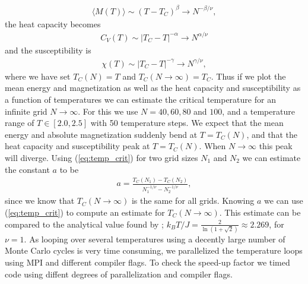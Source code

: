 \documentclass[twocolumn]{aastex62}
\begin{document}
\begin{align}\label{eq:thermoquantM}
	\langle M(T)\rangle \sim (T - T_C)^\beta \to N^{-\beta/\nu},
\end{align}
the heat capacity becomes 
\begin{align}\label{eq:thermoquantCV}
	C_V(T) \sim |T_C - T|^{-\alpha}\to N^{\alpha / \nu}
\end{align}
and the susceptibility is 
\begin{align}\label{eq:thermoquantchi}
	\chi(T)\sim |T_C - T|^{-\gamma} \to N^{\gamma/\nu},
\end{align}
where we have set $T_C(N) = T$ and $T_C(N\to\infty) = T_C$.
Thus if we plot the mean energy and magnetization as well as the heat capacity
and susceptibility as a function of temperatures we can estimate the critical
temperature for an infinite grid $N\to \infty$. For this we use $N = 40, 60, 80$
and $100$, and a temperature range of $T\in[2.0, 2.5]$ with 50 temperature steps. We expect that the mean energy
and absolute magnetization suddenly bend at $T = T_C(N)$, and that the heat
capacity and susceptibility peak at $T = T_C(N)$. When $N\to\infty$ this peak
will diverge. Using (\ref{eq:temp_crit}) for two grid sizes $N_1$ and $N_2$ we
can estimate the constant $a$ to be
\begin{align}
	a = \frac{T_C(N_1) - T_C(N_2)}{N_1^{-1/\nu} - N_2^{-1/\nu}},
\end{align}
since we know that $T_C(N\to\infty)$ is the same for all grids. Knowing $a$ we
can use (\ref{eq:temp_crit}) to compute an estimate for $T_C(N\to\infty)$. This
estimate can be compared to the analytical value found by \cite{onsager:1944};
$k_BT/J = \frac{2}{\ln(1+\sqrt{2})}\approx 2.269$, for $\nu = 1$.
As looping over several temperatures using a decently large number of Monte
Carlo cycles is very time consuming, we parallelized the temperature loops using
MPI and different compiler flags. To check the speed-up factor we timed code using diffent
degrees of parallelization and compiler flags.
\end{document}
